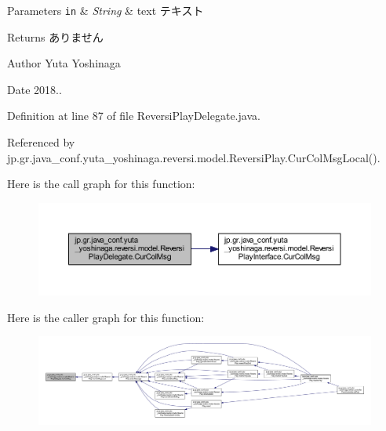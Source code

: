\begin{DoxyParams}[1]{Parameters}
\mbox{\tt in}  & {\em String} & text テキスト \\
\hline
\end{DoxyParams}
\begin{DoxyReturn}{Returns}
ありません 
\end{DoxyReturn}
\begin{DoxyAuthor}{Author}
Yuta Yoshinaga 
\end{DoxyAuthor}
\begin{DoxyDate}{Date}
2018.. 
\end{DoxyDate}


Definition at line 87 of file Reversi\+Play\+Delegate.\+java.



Referenced by jp.\+gr.\+java\+\_\+conf.\+yuta\+\_\+yoshinaga.\+reversi.\+model.\+Reversi\+Play.\+Cur\+Col\+Msg\+Local().

Here is the call graph for this function\+:
\nopagebreak
\begin{figure}[H]
\begin{center}
\leavevmode
\includegraphics[width=350pt]{classjp_1_1gr_1_1java__conf_1_1yuta__yoshinaga_1_1reversi_1_1model_1_1_reversi_play_delegate_a3654121208eb28bbd4972b2835665a73_cgraph}
\end{center}
\end{figure}
Here is the caller graph for this function\+:
\nopagebreak
\begin{figure}[H]
\begin{center}
\leavevmode
\includegraphics[width=350pt]{classjp_1_1gr_1_1java__conf_1_1yuta__yoshinaga_1_1reversi_1_1model_1_1_reversi_play_delegate_a3654121208eb28bbd4972b2835665a73_icgraph}
\end{center}
\end{figure}
\mbox{\label{classjp_1_1gr_1_1java__conf_1_1yuta__yoshinaga_1_1reversi_1_1model_1_1_reversi_play_delegate_a775f366a6cbb877fe8ea577ef869d6b5}} 
